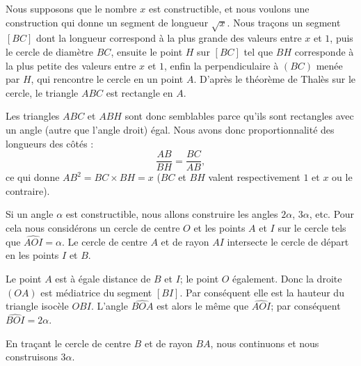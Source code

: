 \begin{example}  \label{ExTYMooSMCvSr}

    Nous supposons que le nombre \( x\) est constructible, et nous voulons une construction qui donne un segment de longueur \( \sqrt{x}\). Nous traçons un segment $[BC]$ dont la longueur correspond à la plus grande des valeurs entre $x$ et $1$, puis le cercle de diamètre $BC$, ensuite le point $H$ sur $[BC]$ tel que $BH$ corresponde à la plus petite des valeurs entre $x$ et $1$, enfin la perpendiculaire à $(BC)$ menée par $H$, qui rencontre le cercle en un point $A$. D'après le théorème de Thalès sur le cercle, le triangle $ABC$ est rectangle en $A$.

    Les triangles \( ABC\) et \( ABH\) sont donc semblables parce qu'ils sont rectangles avec un angle (autre que l'angle droit) égal. Nous avons donc proportionnalité des longueurs des côtés :
    \begin{equation}
        \frac{ AB }{ BH }=\frac{ BC }{ AB },
    \end{equation}
    ce qui donne \( AB^2=BC\times BH=x\) (\( BC\) et \( BH\) valent respectivement \( 1\) et \( x\) ou le contraire).

    \begin{center}
   
    \end{center}

\end{example}

\begin{example} \label{ExAHCooELGGPa}
    Si un angle \( \alpha\) est constructible, nous allons construire les angles \( 2\alpha\), \( 3\alpha\), etc. Pour cela nous considérons un cercle de centre \( O\) et les points \( A\) et \( I\) sur le cercle tels que \( \widehat{AOI}=\alpha\). Le cercle de centre \( A\) et de rayon \( AI\) intersecte le cercle de départ en les points \( I\) et \( B\).

    Le point \( A\) est à égale distance de \( B\) et \( I\); le point \( O\) également. Donc la droite \( (OA)\) est médiatrice du segment \( [BI]\). Par conséquent elle est la hauteur du triangle isocèle \( OBI\). L'angle \( \widehat{BOA}\) est alors le même que \( \widehat{AOI}\); par conséquent \( \widehat{BOI}=2\alpha\).

    \begin{center}
        
    \end{center}

    En traçant le cercle de centre \( B\) et de rayon \( BA\), nous continuons et nous construisons \( 3\alpha\).

\end{example}

